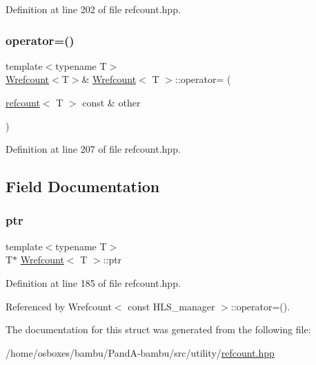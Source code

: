Definition at line 202 of file refcount.\+hpp.

\mbox{\label{classWrefcount_a58d65d790944b6f396693d042859c3ec}} 
\subsubsection{\texorpdfstring{operator=()}{operator=()}\hspace{0.1cm}{\footnotesize\ttfamily [2/2]}}
{\footnotesize\ttfamily template$<$typename T$>$ \\
\hyperlink{classWrefcount}{Wrefcount}$<$T$>$\& \hyperlink{classWrefcount}{Wrefcount}$<$ T $>$\+::operator= (\begin{DoxyParamCaption}\item[{\hyperlink{structrefcount}{refcount}$<$ T $>$ const \&}]{other }\end{DoxyParamCaption})\hspace{0.3cm}{\ttfamily [inline]}}



Definition at line 207 of file refcount.\+hpp.



\subsection{Field Documentation}
\mbox{\label{classWrefcount_ab82d7e2a3301563eb91d4b18e0b6943f}} 
\subsubsection{\texorpdfstring{ptr}{ptr}}
{\footnotesize\ttfamily template$<$typename T$>$ \\
T$\ast$ \hyperlink{classWrefcount}{Wrefcount}$<$ T $>$\+::ptr\hspace{0.3cm}{\ttfamily [private]}}



Definition at line 185 of file refcount.\+hpp.



Referenced by Wrefcount$<$ const H\+L\+S\+\_\+manager $>$\+::operator=().



The documentation for this struct was generated from the following file\+:\begin{DoxyCompactItemize}
\item 
/home/osboxes/bambu/\+Pand\+A-\/bambu/src/utility/\hyperlink{refcount_8hpp}{refcount.\+hpp}\end{DoxyCompactItemize}
